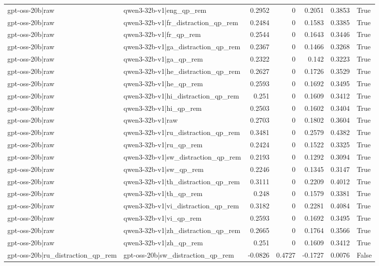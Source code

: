 \begin{table}
\begin{tabular}{l l r r r r l}
gpt-oss-20b|raw & qwen3-32b-v1|eng_qp_rem & 0.2952 & 0 & 0.2051 & 0.3853 & True \\
gpt-oss-20b|raw & qwen3-32b-v1|fr_distraction_qp_rem & 0.2484 & 0 & 0.1583 & 0.3385 & True \\
gpt-oss-20b|raw & qwen3-32b-v1|fr_qp_rem & 0.2544 & 0 & 0.1643 & 0.3446 & True \\
gpt-oss-20b|raw & qwen3-32b-v1|ga_distraction_qp_rem & 0.2367 & 0 & 0.1466 & 0.3268 & True \\
gpt-oss-20b|raw & qwen3-32b-v1|ga_qp_rem & 0.2322 & 0 & 0.142 & 0.3223 & True \\
gpt-oss-20b|raw & qwen3-32b-v1|he_distraction_qp_rem & 0.2627 & 0 & 0.1726 & 0.3529 & True \\
gpt-oss-20b|raw & qwen3-32b-v1|he_qp_rem & 0.2593 & 0 & 0.1692 & 0.3495 & True \\
gpt-oss-20b|raw & qwen3-32b-v1|hi_distraction_qp_rem & 0.251 & 0 & 0.1609 & 0.3412 & True \\
gpt-oss-20b|raw & qwen3-32b-v1|hi_qp_rem & 0.2503 & 0 & 0.1602 & 0.3404 & True \\
gpt-oss-20b|raw & qwen3-32b-v1|raw & 0.2703 & 0 & 0.1802 & 0.3604 & True \\
gpt-oss-20b|raw & qwen3-32b-v1|ru_distraction_qp_rem & 0.3481 & 0 & 0.2579 & 0.4382 & True \\
gpt-oss-20b|raw & qwen3-32b-v1|ru_qp_rem & 0.2424 & 0 & 0.1522 & 0.3325 & True \\
gpt-oss-20b|raw & qwen3-32b-v1|sw_distraction_qp_rem & 0.2193 & 0 & 0.1292 & 0.3094 & True \\
gpt-oss-20b|raw & qwen3-32b-v1|sw_qp_rem & 0.2246 & 0 & 0.1345 & 0.3147 & True \\
gpt-oss-20b|raw & qwen3-32b-v1|th_distraction_qp_rem & 0.3111 & 0 & 0.2209 & 0.4012 & True \\
gpt-oss-20b|raw & qwen3-32b-v1|th_qp_rem & 0.248 & 0 & 0.1579 & 0.3381 & True \\
gpt-oss-20b|raw & qwen3-32b-v1|vi_distraction_qp_rem & 0.3182 & 0 & 0.2281 & 0.4084 & True \\
gpt-oss-20b|raw & qwen3-32b-v1|vi_qp_rem & 0.2593 & 0 & 0.1692 & 0.3495 & True \\
gpt-oss-20b|raw & qwen3-32b-v1|zh_distraction_qp_rem & 0.2665 & 0 & 0.1764 & 0.3566 & True \\
gpt-oss-20b|raw & qwen3-32b-v1|zh_qp_rem & 0.251 & 0 & 0.1609 & 0.3412 & True \\
gpt-oss-20b|ru_distraction_qp_rem & gpt-oss-20b|sw_distraction_qp_rem & -0.0826 & 0.4727 & -0.1727 & 0.0076 & False \\

\end{tabular}
\end{table}
